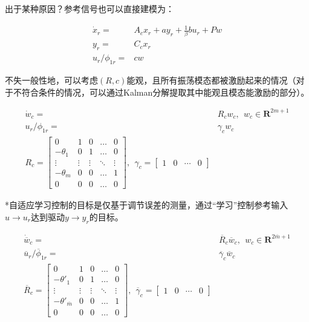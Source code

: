 \documentclass[
  12pt,
  a4paper
]{article}
\begin{document}
出于某种原因？参考信号也可以直接建模为：

\[\begin{aligned}
{\dot{x}}_{r} = & A_{c}x_{r} + ay_{r} + \frac{1}{\beta}bu_{r} + Pw \\
y_{r} = & C_{c}x_{r} \\
u_{r}/\phi_{1r} = & cw
\end{aligned}\]

不失一般性地，可以考虑\((R,c)\)能观，且所有振荡模态都被激励起来的情况（对于不符合条件的情况，可以通过Kalman分解提取其中能观且模态能激励的部分）。

\[\begin{aligned}
{\dot{w}}_{c} = & R_{c}w_{c},\ \ w_{c} \in \mathbf{R}^{2m + 1} \\
u_{r}/\phi_{1r} = & \gamma_{c}w_{c} \\
R_{c} = \begin{bmatrix}
0 & 1 & 0 & \ldots & 0 \\
 - \theta_{1} & 0 & 1 & \ldots & 0 \\
 \vdots & \vdots & \vdots & \ddots & \vdots \\
 - \theta_{m} & 0 & 0 & \ldots & 1 \\
0 & 0 & 0 & \ldots & 0
\end{bmatrix},\ \ \gamma_{c} = \begin{bmatrix}
1 & 0 & \cdots & 0
\end{bmatrix}
\end{aligned}\]

*自适应学习控制的目标是仅基于调节误差的测量，通过``学习''控制参考输入\(u \rightarrow u_{r}\)达到驱动\(y \rightarrow y_{r}\)的目标。

\[\begin{aligned}
{\dot{\overline{w}}}_{c} = & {\overline{R}}_{c}{\overline{w}}_{c},\ \ w_{c} \in \mathbf{R}^{2\overline{m} + 1} \\
{\overline{u}}_{r}/{\overline{\phi}}_{1r} = & {\overline{\gamma}}_{c}{\overline{w}}_{c} \\
{\overline{R}}_{c} = \begin{bmatrix}
0 & 1 & 0 & \ldots & 0 \\
 - {\theta'}_{1} & 0 & 1 & \ldots & 0 \\
 \vdots & \vdots & \vdots & \ddots & \vdots \\
 - {\theta'}_{\overline{m}} & 0 & 0 & \ldots & 1 \\
0 & 0 & 0 & \ldots & 0
\end{bmatrix},\ \ {\overline{\gamma}}_{c} = \begin{bmatrix}
1 & 0 & \cdots & 0
\end{bmatrix}
\end{aligned}\]
\end{document}
